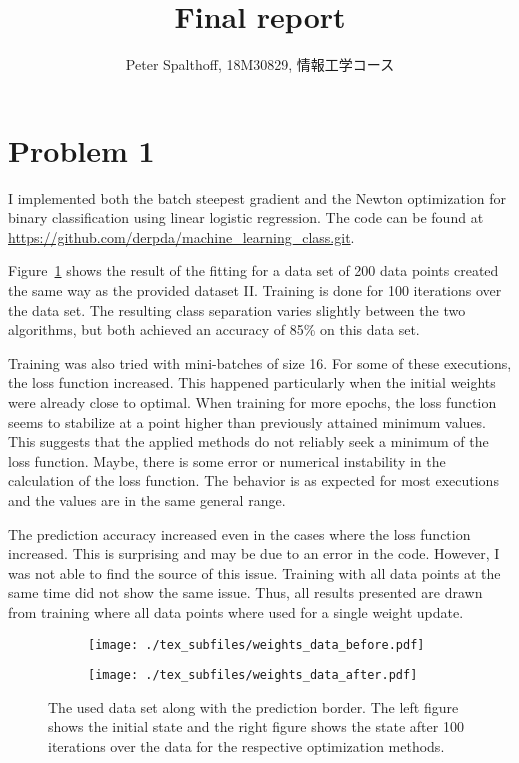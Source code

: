 \documentclass[a4paper]{article}
\author{Peter Spalthoff, 18M30829, 情報工学コース}
\title{Final report}
\begin{document}
\maketitle
\section{Problem 1}
I implemented both the batch steepest gradient and the Newton optimization for
binary classification using linear logistic regression. The code can be found at
\url{https://github.com/derpda/machine_learning_class.git}.

Figure~\ref{fig:weights_data} shows the result of the fitting for a data set of
200 data points created the same way as the provided dataset II\@. Training is
done for 100 iterations over the data set. The resulting class separation varies
slightly between the two algorithms, but both achieved an accuracy of 85\% on
this data set.

Training was also tried with mini-batches of size 16. For some of these
executions, the loss function increased. This happened particularly when the
initial weights were already close to optimal. When training for more epochs,
the loss function seems to stabilize at a point higher than previously attained
minimum values. This suggests that the applied methods do not reliably seek a
minimum of the loss function. Maybe, there is some error or numerical
instability in the calculation of the loss function. The behavior is as
expected for most executions and the values are in the same general range.

The prediction accuracy increased even in the cases where the loss function
increased. This is surprising and may be due to an error in the code. However, I
was not able to find the source of this issue. Training with all data points at
the same time did not show the same issue. Thus, all results presented are drawn
from training where all data points where used for a single weight update.

\begin{figure}[hbt]
    \begin{subfigure}{.5\textwidth}
        \texttt{[image: ./tex\_subfiles/weights\_data\_before.pdf]}
    \end{subfigure}%
    \begin{subfigure}{.5\textwidth}
        \texttt{[image: ./tex\_subfiles/weights\_data\_after.pdf]}
    \end{subfigure}
    \caption{The used data set along with the prediction border. The left figure
    shows the initial state and the right figure shows the state after 100
    iterations over the data for the respective optimization methods.}\label{fig:weights_data}
\end{figure}
\end{document}
